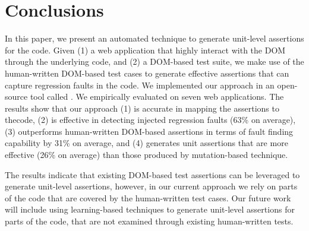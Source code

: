 \section{Conclusions} \label{Sec:concs}
In this paper, we present an automated technique to generate unit-level assertions for the \javascript code. Given (1) a web application that highly interact with the DOM through the underlying \javascript code, and (2) a DOM-based test suite, we make use of the human-written DOM-based test cases to generate effective assertions that can capture regression faults in the \javascript code. We implemented our approach in an open-source tool called \tool. We empirically evaluated \tool on seven web applications. The results show that our approach (1) is accurate in mapping the assertions to the\javascript code, (2) is effective in detecting injected regression faults (63\% on average), (3) outperforms human-written DOM-based assertions in terms of fault finding capability by 31\% on average, and (4) generates unit assertions that are more effective (26\% on average) than those produced by mutation-based technique.

The results indicate that existing DOM-based test assertions can be leveraged to generate unit-level assertions, however, in our current approach we rely on parts of the code that are covered by the human-written test cases. Our future work will include using learning-based techniques to generate unit-level assertions for parts of the code, that are not examined through existing human-written tests.     
